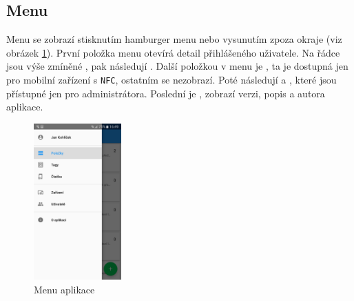 \documentclass[czech,BP]{thesiskiv}
\begin{document}
\subsection{Menu}
Menu se zobrazí stisknutím hamburger menu nebo vysunutím zpoza okraje (viz obrázek \ref{fig:Screenshot_20170607-164924}).
První položka menu otevírá detail přihlášeného uživatele.
Na  řádce jsou výše zmíněné , pak následují .
Další položkou v menu je , ta je dostupná jen pro mobilní zařízení s \texttt{NFC}, ostatním se nezobrazí.
Poté následují  a , které jsou přístupné jen pro administrátora.
Poslední je , zobrazí verzi, popis a autora aplikace.
\begin{figure}[h]
	\centering
	\includegraphics[width=0.3\textwidth]{../images/client_android/Screenshot_20170607-164924.png}	
	\caption{Menu aplikace}
	\label{fig:Screenshot_20170607-164924}
\end{figure}
\end{document}
